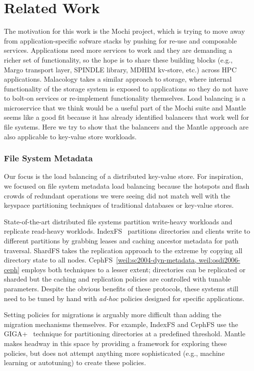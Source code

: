 \section{Related Work}

The motivation for this work is the Mochi project, which is trying to move away
from application-specific sofware stacks by pushing for re-use and composable
services.  Applications need more services to work and they are demanding a
richer set of functionality, so the hope is to share these building blocks
(e.g., Margo transport layer, SPINDLE library, MDHIM kv-store, etc.) across HPC
applications.  Malacology takes a similar approach to storage, where internal
functionality of the storage system is exposed to applications so they do not
have to bolt-on services or re-implement functionality themselves. Load
balancing is a microservice that we think would be a useful part of the Mochi
suite and Mantle seems like a good fit because it has already
identified balancers that work well for file systems. Here we try to show that
the balancers and the Mantle approach are also applicable to key-value store
workloads. 

\subsubsection*{File System Metadata} Our focus is the load balancing of a
distributed key-value store. For inspiration, we focused on file system
metadata load balancing because the hotspots and flash crowds of redundant
operations we were seeing did not match well with the keyspace partitioning
techniques of traditional databases or key-value stores.

State-of-the-art distributed file systems partition write-heavy workloads and
replicate read-heavy worklods.  IndexFS~\cite{ren:sc2014-indexfs}
partitions directories and clients write to different partitions by grabbing
leases and caching ancestor metadata for path traversal. ShardFS takes the
replication approach to the extreme by copying all directory state to all
nodes. CephFS~\ref{weil:sc2004-dyn-metadata, weil:osdi2006-ceph} employs both
techniques to a lesser extent; directories can be replicated or sharded but the
caching and replication policies are controlled with tunable parameters.
Despite the obvious benefits of these protocols, these systems still need to be
tuned by hand with {\it ad-hoc} policies designed for specific applications. 

Setting policies for migrations is arguably more difficult than adding the
migration mechanisms themselves.  For example, IndexFS and CephFS use the
GIGA+~\cite{patil:fast2011-giga} technique for partitioning directories at a
predefined threshold. Mantle makes headway in this space by providing a
framework for exploring these policies, but does not attempt anything more
sophisticated (e.g., machine learning or autotuning) to create these policies. 

